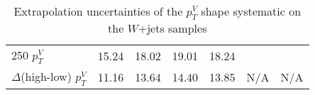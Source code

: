 \begin{table}[!htb]
{\begin{tabular}{lS[table-format=3.2]S[table-format=3.2]S[table-format=3.2]S[table-format=3.2]S[table-format=3.2]S[table-format=3.2]}
      250 $p_T^V$                  & 15.24 & 18.02 & 19.01 & 18.24 &               &              \\
      $\Delta$(high-low) $p_T^V$   & 11.16 & 13.64 & 14.40 & 13.85 &     N/A          &      N/A  \\
      \bottomrule
    \end{tabular}
  }
  \caption{Extrapolation uncertainties of the $p_T^V$ shape systematic on the
    $W$+jets samples}
  \label{tab:wjets-extrapolation_uncertainties_pTV}
\end{table}